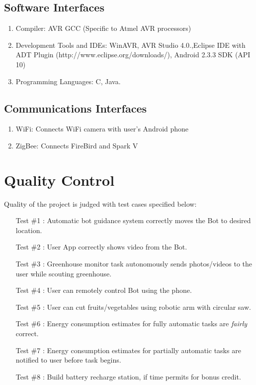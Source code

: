 \documentclass[a4paper, 12pt]{article}
\begin{document}
\subsection{Software Interfaces}
\begin{enumerate}
 \item Compiler: AVR GCC (Specific to Atmel AVR processors)
 \item Development Tools and IDEs: WinAVR, AVR Studio 4.0.,Eclipse IDE with ADT Plugin
 (http://www.eclipse.org/downloads/), Android 2.3.3 SDK (API 10) \cite{adr}
 \item Programming Languages: C, Java.
\end{enumerate}

\subsection{Communications Interfaces}
\begin{enumerate}
 \item WiFi: Connects WiFi camera with user's Android phone
 \item ZigBee: Connects FireBird and Spark V
 \end{enumerate}

\section{Quality Control}
Quality of the project is judged with test cases specified below:
\begin{enumerate}
 \item[Test \#1]: Automatic bot guidance system correctly moves the Bot to desired location.
 \item[Test \#2]: User App correctly shows video from the Bot.
 \item[Test \#3]: Greenhouse monitor task autonomously sends photos/videos to the user while scouting greenhouse.
 \item[Test \#4]: User can remotely control Bot using the phone.
 \item[Test \#5]: User can cut fruits/vegetables using robotic arm with circular saw.
 \item[Test \#6]: Energy consumption estimates for fully automatic tasks are \emph{fairly} correct.
 \item[Test \#7]: Energy consumption estimates for partially automatic tasks are notified to user before task begins.
 \item[Test \#8]: Build battery recharge station, if time permits for bonus credit.
 \end{enumerate}
\end{document}
